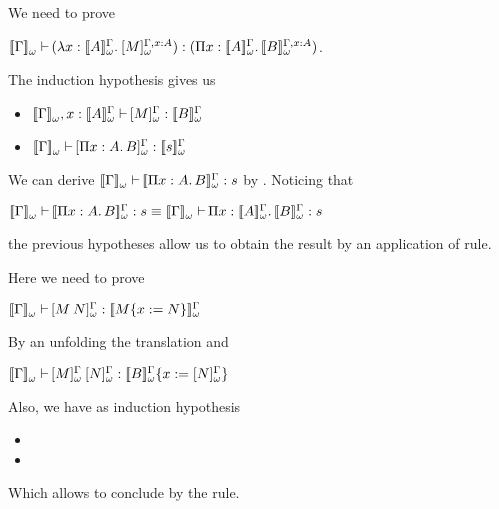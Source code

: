 \begin{Proof}
\begin{ProofCase}{\CicAbs}
We need to prove
\begin{center}
$\ctyping[][\WContextTrans{\Context}]{
    (\abs{x}{\WTypeTrans{A}}{\WTrans[\typing{x}{A}]{M}})
    }{
    (\depArrow{x}{\WTypeTrans{A}}{\WTypeTrans[\typing{x}{A}]{B}})
    }$. 
\end{center}
The induction hypothesis gives us
\begin{itemize}
\item $\ctyping[\typing{x}{\WTypeTrans{A}}][\WContextTrans{\Context}]{
        \WTrans{M}}{\WTypeTrans{B}}$
\item $\ctyping[][\WContextTrans{\Context}]{
        \WTrans{\depArrow{x}{A}{B}}}{\WTypeTrans{s}}$
\end{itemize}
We can derive 
$\ctyping[][\WContextTrans{\Context}]{\WTypeTrans{\depArrow{x}{A}{B}}}{s}$ by  
. Noticing that
\begin{center}
$
\ctyping[][\WContextTrans{\Context}]{\WTypeTrans{\depArrow{x}{A}{B}}}{s}
\equiv
\ctyping[][\WContextTrans{\Context}]{\depArrow{x}{\WTypeTrans{A}}{\WTypeTrans{B}}}{s}
$
\end{center}
the previous hypotheses allow us to obtain the result by an application of \CicAbs{} rule.
\end{ProofCase}

\begin{ProofCase}{\CicApp}
Here we need to prove
\begin{center}
$\ctyping[][\WContextTrans{\Context}]{\WTrans{\app{M}{N}}}{\WTypeTrans{\subst{M}{x}{N}}}$
\end{center}
By an unfolding the translation and 
\begin{center}
$\ctyping[][\WContextTrans{\Context}]{
    \app{\WTrans{M}}{\WTrans{N}}}{\subst{\WTypeTrans{B}}{x}{\WTrans{N}}}$
\end{center}
Also, we have as induction hypothesis
\begin{itemize}
\item {}
\item {}
\end{itemize}
Which allows to conclude by the \CicApp{} rule.
\end{ProofCase}


\end{Proof}
